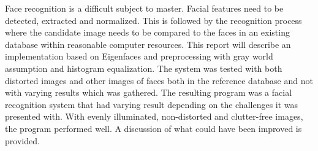 Face recognition is a difficult subject to master. Facial features need to be detected, extracted and normalized. This is followed by the recognition process where the candidate image needs to be compared to the faces in an existing database within reasonable computer resources. This report will describe an implementation based on Eigenfaces and preprocessing with gray world assumption and histogram equalization. The system was tested with both distorted images and other images of faces both in the reference database and not with varying results which was gathered.  The resulting program was a facial recognition system that had varying result depending on the challenges it was presented with. With evenly illuminated, non-distorted and clutter-free images, the program performed well. A discussion of what could have been improved is provided.
